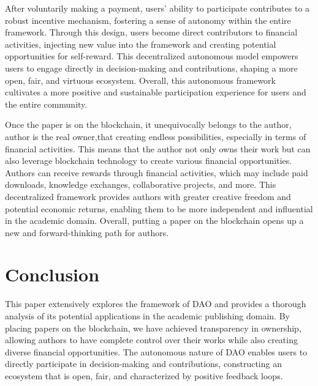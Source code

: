 \documentclass[lettersize,journal]{IEEEtran}
\begin{document}
After voluntarily making a payment, users' ability to participate contributes to a robust incentive mechanism, fostering a sense of autonomy within the entire framework. Through this design, users become direct contributors to financial activities, injecting new value into the framework and creating potential opportunities for self-reward. This decentralized autonomous model empowers users to engage directly in decision-making and contributions, shaping a more open, fair, and virtuous ecosystem. Overall, this autonomous framework cultivates a more positive and sustainable participation experience for users and the entire community.

Once the paper is on the blockchain, it unequivocally belongs to the author, author is the real owner,that creating endless possibilities, especially in terms of financial activities. This means that the author not only owns their work but can also leverage blockchain technology to create various financial opportunities. Authors can receive rewards through financial activities, which may include paid downloads, knowledge exchanges, collaborative projects, and more. This decentralized framework provides authors with greater creative freedom and potential economic returns, enabling them to be more independent and influential in the academic domain. Overall, putting a paper on the blockchain opens up a new and forward-thinking path for authors.



\section{Conclusion}
This paper extensively explores the framework of DAO and provides a thorough analysis of its potential applications in the academic publishing domain. By placing papers on the blockchain, we have achieved transparency in ownership, allowing authors to have complete control over their works while also creating diverse financial opportunities. The autonomous nature of DAO enables users to directly participate in decision-making and contributions, constructing an ecosystem that is open, fair, and characterized by positive feedback loops.
\end{document}
